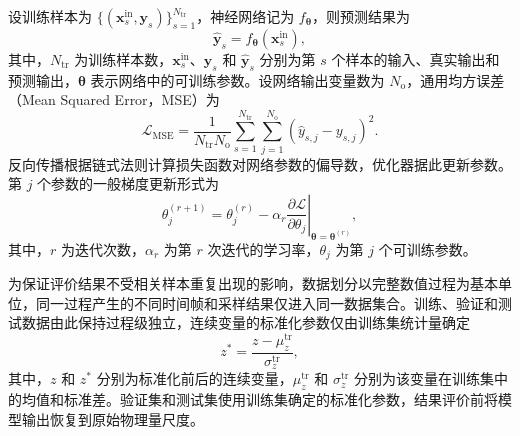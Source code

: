 设训练样本为 $\{(\boldsymbol{x}_s^{\mathrm{in}},\boldsymbol{y}_s)\}_{s=1}^{N_{\mathrm{tr}}}$，神经网络记为 $f_{\boldsymbol{\theta}}$，则预测结果为
\begin{equation}
\widehat{\boldsymbol{y}}_s
=
f_{\boldsymbol{\theta}}(\boldsymbol{x}_s^{\mathrm{in}}),
\label{eq:ch2_network_mapping}
\end{equation}
其中，$N_{\mathrm{tr}}$ 为训练样本数，$\boldsymbol{x}_s^{\mathrm{in}}$、$\boldsymbol{y}_s$ 和 $\widehat{\boldsymbol{y}}_s$ 分别为第 $s$ 个样本的输入、真实输出和预测输出，$\boldsymbol{\theta}$ 表示网络中的可训练参数。设网络输出变量数为 $N_{\mathrm o}$，通用均方误差（Mean Squared Error，MSE）为
\begin{equation}
\mathcal{L}_{\mathrm{MSE}}
=
\frac{1}{N_{\mathrm{tr}}N_{\mathrm o}}
\sum_{s=1}^{N_{\mathrm{tr}}}
\sum_{j=1}^{N_{\mathrm o}}
\left(
\widehat y_{s,j}-y_{s,j}
\right)^2.
\label{eq:ch2_mse}
\end{equation}
反向传播根据链式法则计算损失函数对网络参数的偏导数，优化器据此更新参数\cite{rumelhart1986backpropagation}。第 $j$ 个参数的一般梯度更新形式为
\begin{equation}
\theta_j^{(r+1)}
=
\theta_j^{(r)}
-
\alpha_r
\left.
\frac{\partial\mathcal L}{\partial\theta_j}
\right|_{\boldsymbol{\theta}=\boldsymbol{\theta}^{(r)}},
\label{eq:ch2_parameter_update}
\end{equation}
其中，$r$ 为迭代次数，$\alpha_r$ 为第 $r$ 次迭代的学习率，$\theta_j$ 为第 $j$ 个可训练参数。

为保证评价结果不受相关样本重复出现的影响，数据划分以完整数值过程为基本单位，同一过程产生的不同时间帧和采样结果仅进入同一数据集合。训练、验证和测试数据由此保持过程级独立，连续变量的标准化参数仅由训练集统计量确定
\begin{equation}
z^{\ast}
=
\frac{z-\mu_z^{\mathrm{tr}}}{\sigma_z^{\mathrm{tr}}},
\label{eq:ch2_standardization}
\end{equation}
其中，$z$ 和 $z^{\ast}$ 分别为标准化前后的连续变量，$\mu_z^{\mathrm{tr}}$ 和 $\sigma_z^{\mathrm{tr}}$ 分别为该变量在训练集中的均值和标准差。验证集和测试集使用训练集确定的标准化参数，结果评价前将模型输出恢复到原始物理量尺度。

